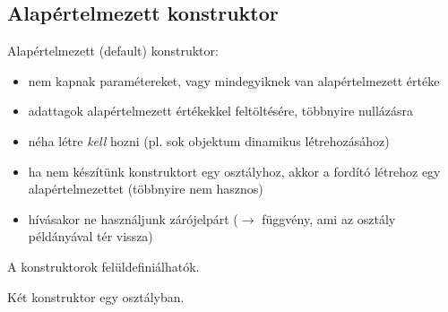 \documentclass[usenames,dvipsnames,aspectratio=169]{beamer}
\begin{document}
\begin{frame}
    \begin{exampleblock}{}
        \footnotesize
        
    \end{exampleblock}
\end{frame}

\subsection{Alapértelmezett konstruktor}

\begin{frame}
    Alapértelmezett (default) konstruktor:
    \begin{itemize}
        \item nem kapnak paramétereket, vagy mindegyiknek van alapértelmezett értéke
        \item adattagok alapértelmezett értékekkel feltöltésére, többnyire nullázásra
        \item néha létre \emph{kell} hozni (pl. sok objektum dinamikus létrehozásához)
        \item ha nem készítünk konstruktort egy osztályhoz, akkor a fordító létrehoz egy alapértelmezettet (többnyire nem hasznos)
        \item hívásakor ne használjunk zárójelpárt ($\to$ függvény, ami az osztály példányával tér vissza)
    \end{itemize}
    A konstruktorok felüldefiniálhatók.
\end{frame}

\begin{frame}
    Két konstruktor egy osztályban.
    \begin{exampleblock}{}
        
    \end{exampleblock}
\end{frame}

\begin{frame}
    \begin{exampleblock}{}
        
    \end{exampleblock}
\end{frame}
\end{document}
